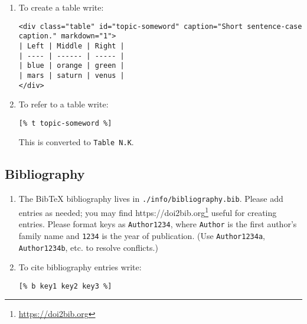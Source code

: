 \documentclass[krantzl]{krantz}
\newcommand{\hreffoot}[2]{{#1}\footnote{\href{#2}{#2}}}
\begin{document}
\begin{enumerate}

\item 

To create a table write:

\begin{lstlisting}[frame=single,frameround=tttt]
<div class="table" id="topic-someword" caption="Short sentence-case caption." markdown="1">
| Left | Middle | Right |
| ---- | ------ | ----- |
| blue | orange | green |
| mars | saturn | venus |
</div>
\end{lstlisting}



\item 

To refer to a table write:

\begin{lstlisting}[frame=single,frameround=tttt]
[% t topic-someword %]
\end{lstlisting}


This is converted to \texttt{Table N.K}.



\end{enumerate}

\subsection*{Bibliography}

\begin{enumerate}

\item 

The BibTeX bibliography lives in \texttt{./info/bibliography.bib}.
    Please add entries as needed;
    you may find \hreffoot{https://doi2bib.org}{https://doi2bib.org} useful for creating entries.
    Please format keys as \texttt{Author1234},
    where \texttt{Author} is the first author's family name
    and \texttt{1234} is the year of publication.
    (Use \texttt{Author1234a}, \texttt{Author1234b}, etc. to resolve conflicts.)



\item 

To cite bibliography entries write:

\begin{lstlisting}[frame=single,frameround=tttt]
[% b key1 key2 key3 %]
\end{lstlisting}



\end{enumerate}
\end{document}
